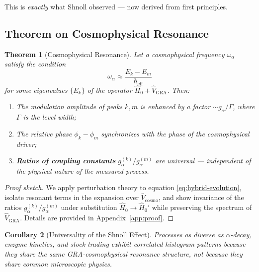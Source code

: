 \documentclass[12pt,a4paper]{article}
\theoremstyle{plain}
\newtheorem{theorem}{Theorem}[section]
\newtheorem{corollary}[theorem]{Corollary}
\theoremstyle{definition}
\theoremstyle{remark}
\newcommand{\GRA}{\text{GRA}}
\newcommand{\eff}{\text{eff}}
\newcommand{\cosmo}{\text{cosmo}}
\begin{document}
This is \emph{exactly} what Shnoll observed --- now derived from first principles.

\subsection{Theorem on Cosmophysical Resonance}

\begin{theorem}[Cosmophysical Resonance]
\label{thm:resonance}
Let a cosmophysical frequency $\omega_{\alpha}$ satisfy the condition
\begin{equation}
\omega_{\alpha} \approx \frac{E_k - E_m}{\hbar_{\eff}}
\label{eq:resonance-condition}
\end{equation}
for some eigenvalues $\{E_k\}$ of the operator $\hat{H}_0 + \hat{V}_{\GRA}$. Then:
\begin{enumerate}
    \item The modulation amplitude of peaks $k,m$ is enhanced by a factor $\sim g_{\alpha}/\Gamma$, where $\Gamma$ is the level width;
    \item The relative phase $\phi_k - \phi_m$ synchronizes with the phase of the cosmophysical driver;
    \item \textbf{Ratios of coupling constants} $g_{\alpha}^{(k)}/g_{\alpha}^{(m)}$ are \emph{universal} --- independent of the physical nature of the measured process.
\end{enumerate}
\end{theorem}

\begin{proof}[Proof sketch]
We apply perturbation theory to equation \eqref{eq:hybrid-evolution}, isolate resonant terms in the expansion over $\hat{V}_{\cosmo}$, and show invariance of the ratios $g_{\alpha}^{(k)}/g_{\alpha}^{(m)}$ under substitution $\hat{H}_0 \to \hat{H}_0'$ while preserving the spectrum of $\hat{V}_{\GRA}$. Details are provided in Appendix~\ref{app:proof}.
\end{proof}

\begin{corollary}[Universality of the Shnoll Effect]
Processes as diverse as $\alpha$-decay, enzyme kinetics, and stock trading exhibit correlated histogram patterns \emph{because they share the same GRA-cosmophysical resonance structure}, not because they share common microscopic physics.
\end{corollary}

\end{document}
